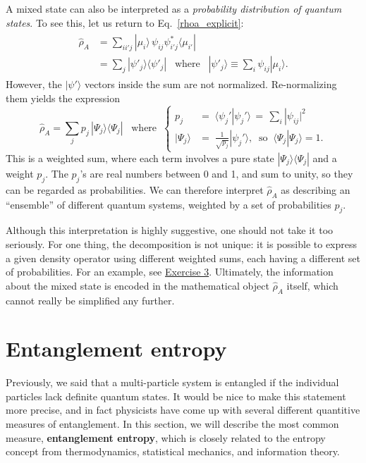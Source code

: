 \documentclass[pra,12pt]{revtex4}
\begin{document}
A mixed state can also be interpreted as a \textit{probability
  distribution of quantum states}.  To see this, let us return to
Eq.~\eqref{rhoa_explicit}:
\begin{align}
  \begin{aligned}\hat{\rho}_A
    &= \sum_{ii'j} |\mu_i\rangle \, \psi_{ij} \psi_{i'j}^*
    \langle \mu_{i'}| \\
    &= \sum_j |\psi'_j\rangle\langle\psi'_j| \;\;\;\mathrm{where}
    \;\;\; |\psi'_j\rangle \equiv \sum_i \psi_{ij} |\mu_i\rangle.
  \end{aligned}
\end{align}
However, the $|\psi'\rangle$ vectors inside the sum are not
normalized.  Re-normalizing them yields the expression
\begin{equation}
  \hat{\rho}_A = \sum_j p_j\, |\Psi_j\rangle \langle \Psi_j|
  \;\;\;\mathrm{where}\;\;
  \begin{cases}
    p_j &= \displaystyle \; \langle \psi_j' | \psi_j' \rangle
    \,=\, \sum_i |\psi_{ij}|^2 \\
    |\Psi_j \rangle &= \displaystyle \; \frac{1}{\sqrt{p_j}} |\psi_j'\rangle,
    \;\;\textrm{so}\;\; \langle \Psi_j|\Psi_j \rangle = 1.
  \end{cases}
\end{equation}
This is a weighted sum, where each term involves a pure state
$|\Psi_j\rangle \langle \Psi_j|$ and a weight $p_j$.  The $p_j$'s are
real numbers between 0 and 1, and sum to unity, so they can be
regarded as probabilities.  We can therefore interpret $\hat{\rho}_A$
as describing an ``ensemble'' of different quantum systems, weighted
by a set of probabilities $p_j$.

Although this interpretation is highly suggestive, one should not take
it too seriously.  For one thing, the decomposition is not unique: it
is possible to express a given density operator using different
weighted sums, each having a different set of probabilities.  For an
example, see \hyperref[ex:rho_decomp]{Exercise 3}.  Ultimately, the
information about the mixed state is encoded in the mathematical
object $\hat{\rho}_A$ itself, which cannot really be simplified any
further.

\section{Entanglement entropy}
\label{sec:entropy}

Previously, we said that a multi-particle system is entangled if the
individual particles lack definite quantum states.  It would be nice
to make this statement more precise, and in fact physicists have come
up with several different quantitive measures of entanglement.  In
this section, we will describe the most common measure,
\textbf{entanglement entropy}, which is closely related to the entropy
concept from thermodynamics, statistical mechanics, and information
theory.
\end{document}

